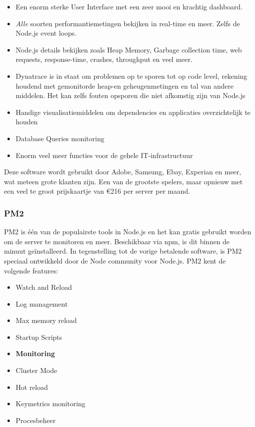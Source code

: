 \begin{itemize}
	\item Een enorm sterke User Interface met een zeer mooi en krachtig dashboard.
	\item \textit{Alle} soorten performantiemetingen bekijken in real-time en meer. Zelfs de Node.js event loops.
	\item Node.js details bekijken zoals Heap Memory, Garbage collection time, web requests, response-time, crashes, throughput en veel meer.
	\item Dynatrace is in staat om problemen op te sporen tot op code level, rekening houdend met gemonitorde heap-en geheugenmetingen en tal van andere middelen. Het kan zelfs fouten opsporen die niet afkomstig zijn van Node.js
	\item Handige visualisatiemiddelen om dependencies en applicaties overzichtelijk te houden
	\item Database Queries monitoring
	\item Enorm veel meer functies voor de gehele IT-infrastructuur
\end{itemize}

Deze software wordt gebruikt door Adobe, Samsung, Ebay, Experian en meer, wat meteen grote klanten zijn. Een van de grootste spelers, maar opnieuw met een veel te groot prijskaartje van \euro216 per server per maand.

\subsubsection{PM2}
\label{sec:pm2}

PM2 is één van de populairste tools in Node.js en het kan gratis gebruikt worden om de server te monitoren en meer. Beschikbaar via npm, is dit binnen de minuut geïnstalleerd. In tegenstelling tot de vorige betalende software, is PM2 speciaal ontwikkeld door de Node community voor Node.js. PM2 kent de volgende features:

\begin{itemize}
	\item Watch and Reload
	\item Log management
	\item Max memory reload
	\item Startup Scripts
	\item \textbf{Monitoring}
	\item Cluster Mode
	\item Hot reload
	\item Keymetrics monitoring
	\item Procesbeheer
\end{itemize}

